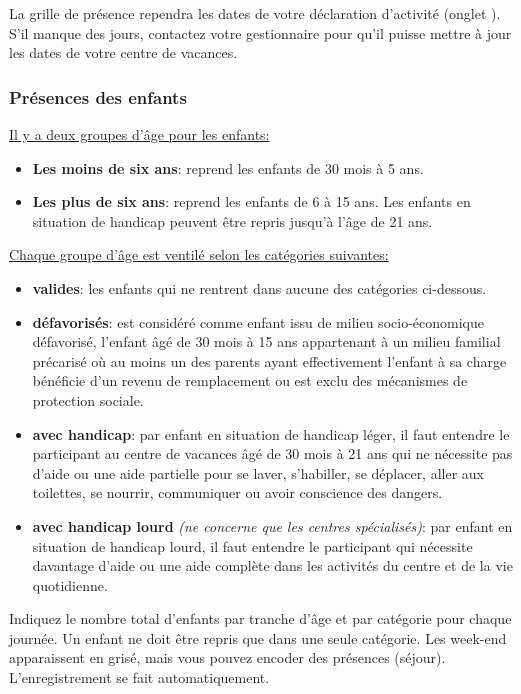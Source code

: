 \begin{info}
La grille de présence rependra les dates de votre déclaration d'activité (onglet ). S'il manque des jours, contactez votre gestionnaire pour qu'il puisse mettre à jour les dates de votre centre de vacances. 
\end{info}

\subsubsection{Présences des enfants}
\underline{Il y a deux groupes d'âge pour les enfants:}

\begin{itemize}
    \item \textbf{Les moins de six ans}: reprend les enfants de 30 mois à 5 ans.
    \item \textbf{Les plus de six ans}: reprend les enfants de 6 à 15 ans. Les enfants en situation de handicap peuvent être repris jusqu'à l'âge de 21 ans.
\end{itemize}

\underline{Chaque groupe d'âge est ventilé selon les catégories suivantes:}
\begin{itemize}
    \item \textbf{valides}: les enfants qui ne rentrent dans aucune des catégories ci-dessous. 
    \item \textbf{défavorisés}: est considéré comme enfant issu de milieu socio-économique défavorisé, l'enfant âgé de 30 mois à 15 ans appartenant à un milieu familial précarisé où au moins un des parents ayant effectivement l'enfant à sa charge bénéficie d'un revenu de remplacement ou est exclu des mécanismes de protection sociale.
    \item \textbf{avec handicap}: par enfant en situation de handicap léger, il faut entendre le participant au centre de vacances âgé de 30 mois à 21 ans qui ne nécessite pas d'aide ou une aide partielle pour se laver, s'habiller, se déplacer, aller aux toilettes, se nourrir, communiquer ou avoir conscience des dangers.
    \item \textbf{avec handicap lourd} \textit{(ne concerne que les centres spécialisés)}: par enfant en situation de handicap lourd, il faut entendre le participant qui nécessite davantage d'aide ou une aide complète dans les activités du centre et de la vie quotidienne.
\end{itemize}

\begin{tcolorbox}[title=Comment encoder les présences des enfants ?]
Indiquez le nombre total d'enfants par tranche d'âge et par catégorie pour chaque journée. Un enfant ne doit être repris que dans une seule catégorie. Les week-end apparaissent en grisé, mais vous pouvez encoder des présences (séjour). L'enregistrement se fait automatiquement.

\end{tcolorbox}

